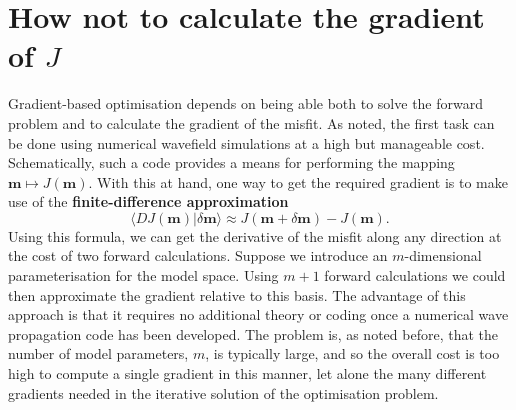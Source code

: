 \section*{How not to calculate the gradient of $J$}
Gradient-based optimisation depends on being able both to solve the forward problem and to 
calculate the gradient of the misfit. As noted, the first task can be done using numerical wavefield simulations 
at a high but manageable cost. Schematically, such a code provides a means for performing the 
mapping $\mathbf{m}\mapsto J(\mathbf{m})$. With this at hand, one way to get the required gradient is to make use of 
the \textbf{finite-difference approximation}
\begin{equation}
\langle DJ(\mathbf{m})|\delta \mathbf{m}\rangle\approx J(\mathbf{m}+\delta \mathbf{m})-J(\mathbf{m}).
\label{eq:8}
\end{equation}
Using this formula, we can get the derivative of the misfit along any direction at the cost of two forward calculations.
Suppose we introduce an $m$-dimensional
parameterisation for the model space. Using $m+1$ forward calculations we could then approximate the gradient relative to this
basis. The advantage of this approach is that it requires no additional theory or coding once a numerical wave propagation 
code has been developed. The problem is, as noted before, that the number of model parameters, $m$, is typically large, and so the
overall cost is too high to compute a single gradient in this manner, let alone the many different gradients needed in the 
iterative solution of the optimisation problem.

